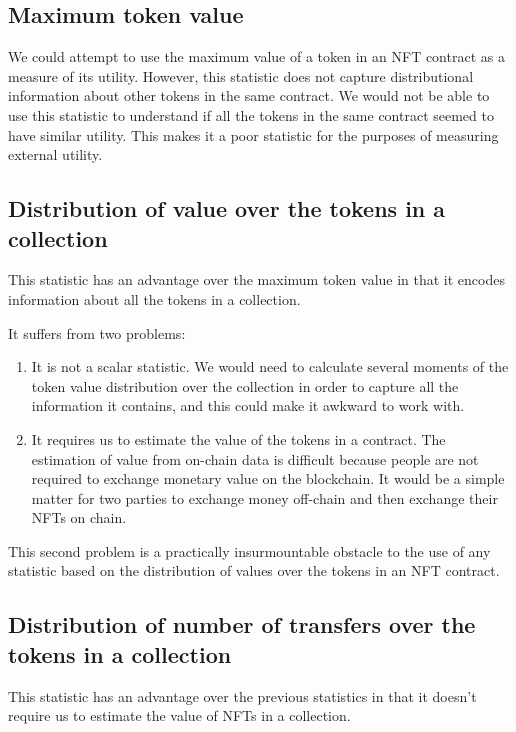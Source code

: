 \documentclass{article}
\begin{document}
\subsection{Maximum token value}

We could attempt to use the maximum value of a token in an NFT contract as a measure of its utility. However, this statistic does not capture distributional information about other tokens in the same contract. We would not be able to use this statistic to understand if all the tokens in the same contract seemed to have similar utility. This makes it a poor statistic for the purposes of measuring external utility.

\subsection{Distribution of value over the tokens in a collection}

This statistic has an advantage over the maximum token value in that it encodes information about all the tokens in a collection.

It suffers from two problems:

\begin{enumerate}

\item{ It is not a scalar statistic. We would need to calculate several moments of the token value distribution over the collection in order to capture all the information it contains, and this could make it awkward to work with.}

\item{ It requires us to estimate the value of the tokens in a contract. The estimation of value from on-chain data is difficult because people are not required to exchange monetary value on the blockchain. It would be a simple matter for two parties to exchange money off-chain and then exchange their NFTs on chain.}

\end{enumerate}

This second problem is a practically insurmountable obstacle to the use of any statistic based on the distribution of values over the tokens in an NFT contract.

\subsection{Distribution of number of transfers over the tokens in a collection}

This statistic has an advantage over the previous statistics in that it doesn't require us to estimate the value of NFTs in a collection.
\end{document}
